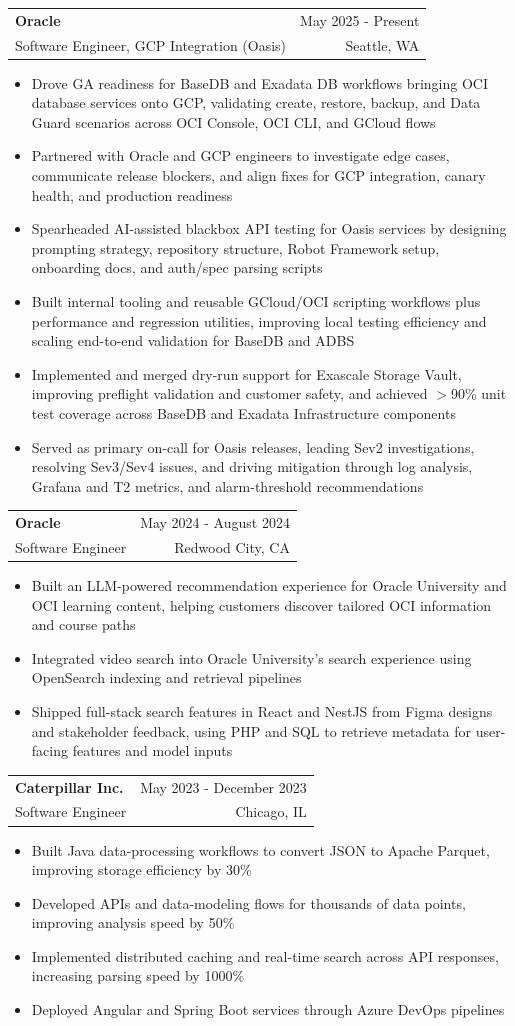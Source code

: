 \documentclass[letterpaper,11pt]{article}
\makeatletter
\newcommand{\resumeItem}[1]{
  \item\small{
    {#1 \vspace{-2pt}}
  }
}
\newcommand{\resumeSubheading}[4]{
  \vspace{-2pt}\item
    \begin{tabular*}{0.97\textwidth}[t]{l@{\extracolsep{\fill}}r}
      \textbf{#1} & #2 \\
      {\small#3} & {\small #4} \\
    \end{tabular*}\vspace{-7pt}
}
\newcommand{\resumeItemListStart}{\begin{itemize}}
\newcommand{\resumeItemListEnd}{\end{itemize}\vspace{-5pt}}
\makeatother
\begin{document}
    \resumeSubheading
  {Oracle}{May 2025 - Present}
  {Software Engineer, GCP Integration (Oasis)}{Seattle, WA}
  \resumeItemListStart
    \resumeItem{Drove GA readiness for BaseDB and Exadata DB workflows bringing OCI database services onto GCP, validating create, restore, backup, and Data Guard scenarios across OCI Console, OCI CLI, and GCloud flows}
    \resumeItem{Partnered with Oracle and GCP engineers to investigate edge cases, communicate release blockers, and align fixes for GCP integration, canary health, and production readiness}
    \resumeItem{Spearheaded AI-assisted blackbox API testing for Oasis services by designing prompting strategy, repository structure, Robot Framework setup, onboarding docs, and auth/spec parsing scripts}
    \resumeItem{Built internal tooling and reusable GCloud/OCI scripting workflows plus performance and regression utilities, improving local testing efficiency and scaling end-to-end validation for BaseDB and ADBS}
    \resumeItem{Implemented and merged dry-run support for Exascale Storage Vault, improving preflight validation and customer safety, and achieved $>$90\% unit test coverage across BaseDB and Exadata Infrastructure components}
    \resumeItem{Served as primary on-call for Oasis releases, leading Sev2 investigations, resolving Sev3/Sev4 issues, and driving mitigation through log analysis, Grafana and T2 metrics, and alarm-threshold recommendations}
  \resumeItemListEnd

    \resumeSubheading
      {Oracle}{May 2024 - August 2024}
      {Software Engineer}{Redwood City, CA}
      \resumeItemListStart
        \resumeItem{Built an LLM-powered recommendation experience for Oracle University and OCI learning content, helping customers discover tailored OCI information and course paths}
        \resumeItem{Integrated video search into Oracle University's search experience using OpenSearch indexing and retrieval pipelines}
        \resumeItem{Shipped full-stack search features in React and NestJS from Figma designs and stakeholder feedback, using PHP and SQL to retrieve metadata for user-facing features and model inputs}
      \resumeItemListEnd

    \resumeSubheading
      {Caterpillar Inc.}{May 2023 - December 2023}
      {Software Engineer}{Chicago, IL}
      \resumeItemListStart
        \resumeItem{Built Java data-processing workflows to convert JSON to Apache Parquet, improving storage efficiency by 30\%}
        \resumeItem{Developed APIs and data-modeling flows for thousands of data points, improving analysis speed by 50\%}
        \resumeItem{Implemented distributed caching and real-time search across API responses, increasing parsing speed by 1000\%}
        \resumeItem{Deployed Angular and Spring Boot services through Azure DevOps pipelines}
      \resumeItemListEnd
\end{document}
